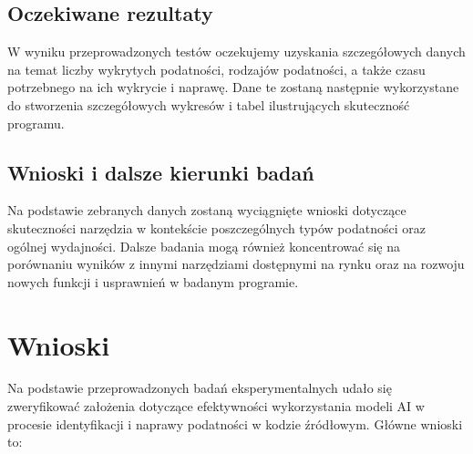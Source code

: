 \subsection{Oczekiwane rezultaty}
W wyniku przeprowadzonych testów oczekujemy uzyskania szczegółowych danych na temat liczby wykrytych podatności, rodzajów podatności, a także czasu potrzebnego na ich wykrycie i naprawę. Dane te zostaną następnie wykorzystane do stworzenia szczegółowych wykresów i tabel ilustrujących skuteczność programu.

\subsection{Wnioski i dalsze kierunki badań}
Na podstawie zebranych danych zostaną wyciągnięte wnioski dotyczące skuteczności narzędzia w kontekście poszczególnych typów podatności oraz ogólnej wydajności. Dalsze badania mogą również koncentrować się na porównaniu wyników z innymi narzędziami dostępnymi na rynku oraz na rozwoju nowych funkcji i usprawnień w badanym programie.


\section{Wnioski}
\label{sec:wnioski}

Na podstawie przeprowadzonych badań eksperymentalnych udało się zweryfikować założenia dotyczące efektywności wykorzystania modeli AI w procesie identyfikacji i naprawy podatności w kodzie źródłowym. Główne wnioski to:


